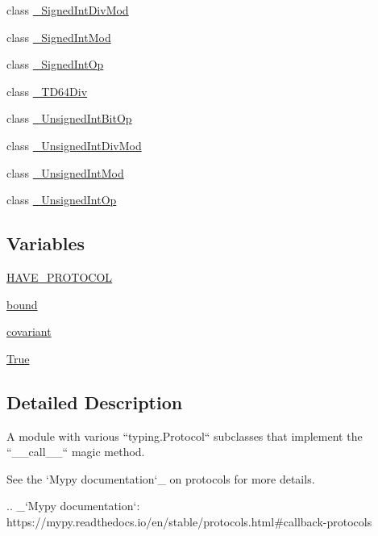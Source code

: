 \begin{DoxyCompactItemize}
class \hyperlink{classnumpy_1_1typing_1_1__callable_1_1__SignedIntDivMod}{\+\_\+\+Signed\+Int\+Div\+Mod}
\item 
class \hyperlink{classnumpy_1_1typing_1_1__callable_1_1__SignedIntMod}{\+\_\+\+Signed\+Int\+Mod}
\item 
class \hyperlink{classnumpy_1_1typing_1_1__callable_1_1__SignedIntOp}{\+\_\+\+Signed\+Int\+Op}
\item 
class \hyperlink{classnumpy_1_1typing_1_1__callable_1_1__TD64Div}{\+\_\+\+T\+D64\+Div}
\item 
class \hyperlink{classnumpy_1_1typing_1_1__callable_1_1__UnsignedIntBitOp}{\+\_\+\+Unsigned\+Int\+Bit\+Op}
\item 
class \hyperlink{classnumpy_1_1typing_1_1__callable_1_1__UnsignedIntDivMod}{\+\_\+\+Unsigned\+Int\+Div\+Mod}
\item 
class \hyperlink{classnumpy_1_1typing_1_1__callable_1_1__UnsignedIntMod}{\+\_\+\+Unsigned\+Int\+Mod}
\item 
class \hyperlink{classnumpy_1_1typing_1_1__callable_1_1__UnsignedIntOp}{\+\_\+\+Unsigned\+Int\+Op}
\end{DoxyCompactItemize}
\subsection*{Variables}
\begin{DoxyCompactItemize}
\item 
\hyperlink{namespacenumpy_1_1typing_1_1__callable_a0d2cea41897e473b08f74b010f72d797}{H\+A\+V\+E\+\_\+\+P\+R\+O\+T\+O\+C\+OL}
\item 
\hyperlink{namespacenumpy_1_1typing_1_1__callable_ae56e1d9013a76d967dbb4de5dd8737d7}{bound}
\item 
\hyperlink{namespacenumpy_1_1typing_1_1__callable_abfd6c693529fb7d49c04d274be05d765}{covariant}
\item 
\hyperlink{namespacenumpy_1_1typing_1_1__callable_aad8d004b118168cd685e3db368457647}{True}
\end{DoxyCompactItemize}


\subsection{Detailed Description}
\begin{DoxyVerb}A module with various ``typing.Protocol`` subclasses that implement
the ``__call__`` magic method.

See the `Mypy documentation`_ on protocols for more details.

.. _`Mypy documentation`: https://mypy.readthedocs.io/en/stable/protocols.html#callback-protocols\end{DoxyVerb}
 

